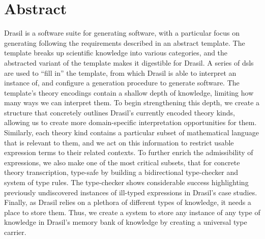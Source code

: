 \chapter{Abstract}
\label{chap:abstract}

Drasil is a software suite for generating software, with a particular focus on
generating  following the requirements described in an abstract
 template. The template breaks up scientific knowledge into various
categories, and the abstracted variant of the template makes it digestible for
Drasil. A series of \acsp{dsl} are used to ``fill in'' the template, from which
Drasil is able to interpret an instance of, and configure a generation procedure
to generate software. The template's theory encodings contain a shallow depth of
knowledge, limiting how many ways we can interpret them. To begin strengthening
this depth, we create a structure that concretely outlines Drasil's currently
encoded theory kinds, allowing us to create more domain-specific interpretation
opportunities for them. Similarly, each theory kind contains a particular subset
of mathematical language that is relevant to them, and we act on this
information to restrict usable expression terms to their related contexts. To
further enrich the admissibility of expressions, we also make one of the most
critical subsets, that for concrete theory transcription, type-safe by building
a bidirectional type-checker and system of type rules. The type-checker shows
considerable success highlighting previously undiscovered instances of ill-typed
expressions in Drasil's case studies. Finally, as Drasil relies on a plethora of
different types of knowledge, it needs a place to store them. Thus, we create a
system to store any instance of any type of knowledge in Drasil's memory bank of
knowledge by creating a universal type carrier.
